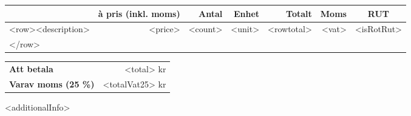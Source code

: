 \documentclass[a4paper,11pt]{extarticle}
\newcommand{\changefont}{%
        \fontsize{9}{11}\selectfont
    }
\newcommand{\tblhdr}{%
\fontsize{9}{11}\selectfont\color{white}
}
\begin{document}
\begin{tabularx}{\linewidth}{Xrrrrrc}
\rowcolor{Primary}
\multicolumn{1}{l}{\tblhdr \color{white}\textbf{Beskrivning}} &
\tblhdr \color{white}\textbf{à pris (inkl. moms)} &
\tblhdr \color{white}\textbf{Antal} &
\tblhdr \color{white}\textbf{Enhet} &
\tblhdr \color{white}\textbf{Totalt} &
\tblhdr \color{white}\textbf{Moms} &
\tblhdr \textbf{RUT}\\
\hline
    <row><description> & <price> & <count> & <unit> & <rowtotal> & <vat> & <isRotRut>\\
    </row>
    & & & & & & \\
\end{tabularx}

\begin{tabularx}{\linewidth}{Xr}
\hline
    \textbf{Att betala} & <total> kr \\
    \textbf{Varav moms (25 \%)} & <totalVat25> kr \\
\hline
\end{tabularx}

\renewcommand\arraystretch{1}

\vspace{2em}
<additionalInfo> \\

%
%

\end{document}
